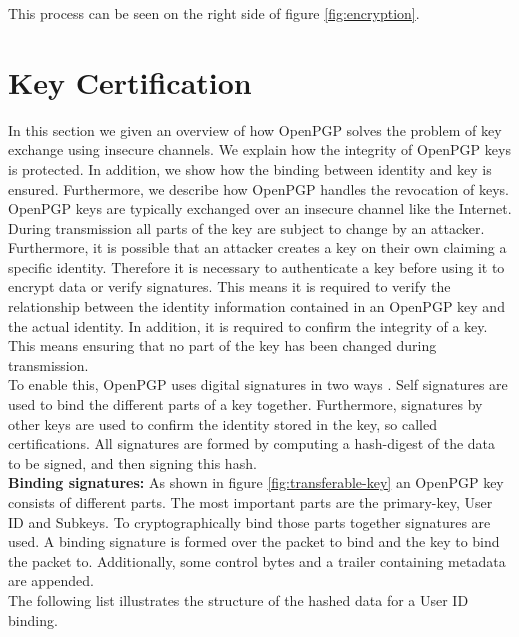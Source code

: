 This process can be seen on the right side of figure \ref{fig:encryption}.

\section{Key Certification}
\label{section:messageformat:cert}

In this section we given an overview of how OpenPGP solves the problem of key exchange using insecure channels. We explain how the integrity of OpenPGP keys is protected. In addition, we show how the binding between identity and key is ensured. Furthermore, we describe how OpenPGP handles the revocation of keys. \\

OpenPGP keys are typically exchanged over an insecure channel like the Internet. During transmission all parts of the key are subject to change by an attacker. Furthermore, it is possible that an attacker creates a key on their own claiming a specific identity. Therefore it is necessary to authenticate a key before using it to encrypt data or verify signatures.
This means it is required to verify the relationship between the identity information contained in an OpenPGP key and the actual identity. In addition, it is required to confirm the integrity of a key. This means ensuring that no part of the key has been changed during transmission. \\

To enable this, OpenPGP uses digital signatures in two ways \cite[section 5.2.4]{RFC4880}. Self signatures are used to bind the different parts of a key together. Furthermore, signatures by other keys are used to confirm the identity stored in the key, so called certifications. All signatures are formed by computing a hash-digest of the data to be signed, and then signing this hash. \\

\textbf{Binding signatures:} As shown in figure \ref{fig:transferable-key} an OpenPGP key consists of different parts. The most important parts are the primary-key, User ID  and Subkeys. To cryptographically bind those parts together signatures are used. A binding signature is formed over the packet to bind and the key to bind the packet to. Additionally, some control bytes and a trailer containing metadata are appended.  \\

The following list illustrates the structure of the hashed data for a User ID binding.

